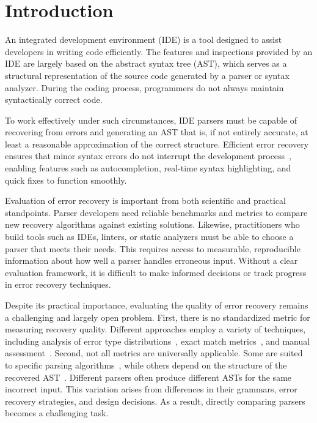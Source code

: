 \documentclass[conference]{IEEEtran}
\begin{document}
\section{Introduction}
An integrated development environment (IDE) is a tool designed to assist developers in writing code efficiently. The features and inspections provided by an IDE are largely based on the abstract syntax tree (AST), which serves as a structural representation of the source code generated by a parser or syntax analyzer. During the coding process, programmers do not always maintain syntactically correct code.

To work effectively under such circumstances, IDE parsers must be capable of recovering from errors and generating an AST that is, if not entirely accurate, at least a reasonable approximation of the correct structure. Efficient error recovery ensures that minor syntax errors do not interrupt the development process~\cite{ide-errors}, enabling features such as autocompletion, real-time syntax highlighting, and quick fixes to function smoothly. 

Evaluation of error recovery is important from both scientific and practical standpoints. Parser developers need reliable benchmarks and metrics to compare new recovery algorithms against existing solutions. Likewise, practitioners who build tools such as IDEs, linters, or static analyzers must be able to choose a parser that meets their needs. This requires access to measurable, reproducible information about how well a parser handles erroneous input. Without a clear evaluation framework, it is difficult to make informed decisions or track progress in error recovery techniques.

Despite its practical importance, evaluating the quality of error recovery remains a challenging and largely open problem. First, there is no standardized metric for measuring recovery quality. Different approaches employ a variety of techniques, including analysis of error type distributions~\cite{error-frequence}, exact match metrics~\cite{ai-recovery-large}, and manual assessment~\cite{forward-move, natural_recovery}. Second, not all metrics are universally applicable. Some are suited to specific parsing algorithms~\cite{panic}, while others depend on the structure of the recovered AST~\cite{fuzz_recovery, natural_recovery}. Different parsers often produce different ASTs for the same incorrect input. This variation arises from differences in their grammars, error recovery strategies, and design decisions. As a result, directly comparing parsers becomes a challenging task.
\end{document}
